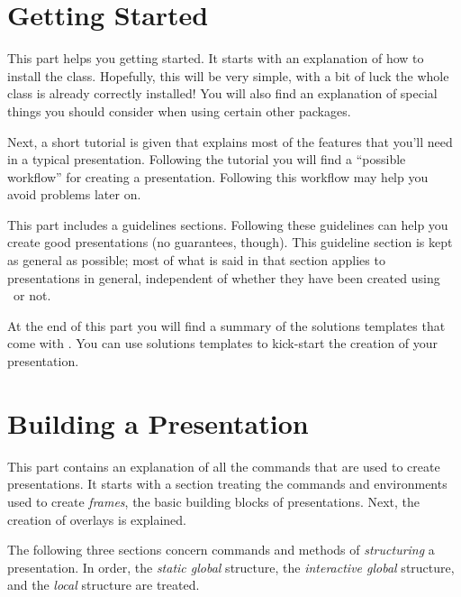 \documentclass{ltxdoc}
\begin{document}
\tableofcontents






\part{Getting Started}

This part helps you getting started. It starts with an explanation of how to install the class. Hopefully, this will be very simple, with a bit of luck the whole class is already correctly installed! You will also find an explanation of special things you should consider when using certain other packages.

Next, a short tutorial is given that explains most of the features that you'll need in a typical presentation. Following the tutorial you will find a ``possible workflow'' for creating a presentation. Following this workflow may help you avoid problems later on.

This part includes a guidelines sections. Following these guidelines can help you create good presentations (no guarantees, though). This guideline section is kept as general as possible; most of what is said in that section applies to presentations in general, independent of whether they have been created using \beamer\ or not.

At the end of this part you will find a summary of the solutions templates that come with \beamer. You can use solutions templates to kick-start the creation of your presentation.










\part{Building a Presentation}

This part contains an explanation of all the commands that are used to create presentations. It starts with a section treating the commands and environments used to create \emph{frames}, the basic building blocks of presentations. Next, the creation of overlays is explained.

The following three sections concern commands and methods of \emph{structuring} a presentation. In order, the \emph{static global} structure, the \emph{interactive global} structure, and the \emph{local} structure are treated.
\end{document}
